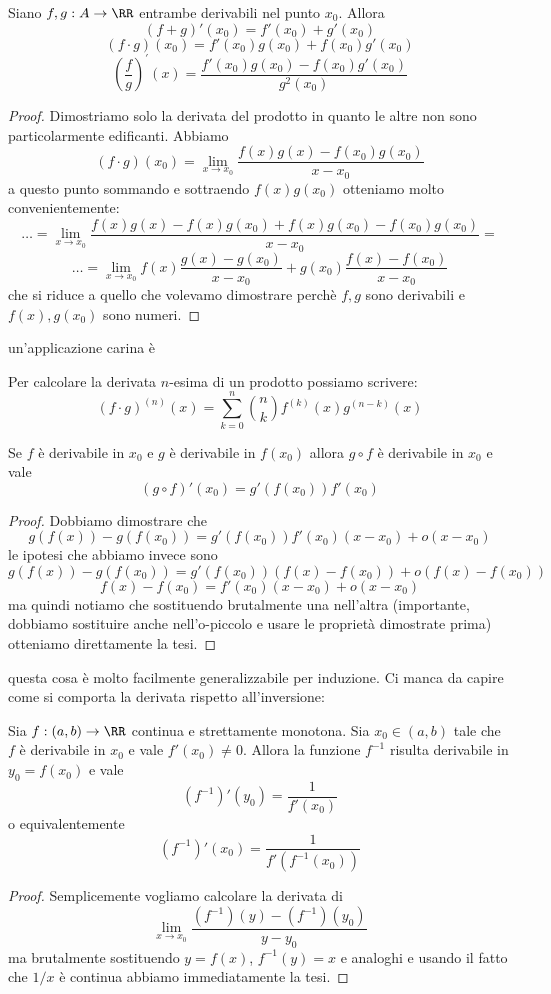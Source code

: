 \documentclass[11pt]{scrartcl}
\begin{document}
	\begin{theorem}
		Siano $f,g:A\to\RR$ entrambe derivabili nel punto $x_0$. Allora
		$$(f+g)'(x_0)=f'(x_0)+g'(x_0)$$
		$$(f\cdot g)(x_0)=f'(x_0)g(x_0)+f(x_0)g'(x_0)$$
		$$\left(\frac{f}{g}\right)^{'}(x)=\frac{f'(x_0)g(x_0)-f(x_0)g'(x_0)}{g^2(x_0)}$$
	\end{theorem}
	\begin{proof}
		Dimostriamo solo la derivata del prodotto in quanto le altre non sono particolarmente edificanti. Abbiamo
		$$(f\cdot g)(x_0)=\lim_{x\to x_0}\frac{f(x)g(x)-f(x_0)g(x_0)}{x-x_0}$$
		a questo punto sommando e sottraendo $f(x)g(x_0)$ otteniamo molto convenientemente:
		$$\dots=\lim_{x\to x_0}\frac{f(x)g(x)-f(x)g(x_0)+f(x)g(x_0)-f(x_0)g(x_0)}{x-x_0}=$$
		$$\dots=\lim_{x\to x_0}f(x)\frac{g(x)-g(x_0)}{x-x_0}+g(x_0)\frac{f(x)-f(x_0)}{x-x_0}$$
		che si riduce a quello che volevamo dimostrare perchè $f,g$ sono derivabili e $f(x),g(x_0)$ sono numeri.
	\end{proof}
	un'applicazione carina è
	\begin{corollary}
		Per calcolare la derivata $n$-esima di un prodotto possiamo scrivere:
		$$(f\cdot g)^{(n)}(x)=\sum_{k=0}^{n}\binom{n}{k}f^{(k)}(x)g^{(n-k)}(x)$$
	\end{corollary}
	\begin{theorem}
		Se $f$ è derivabile in $x_0$ e $g$ è derivabile in $f(x_0)$ allora $g\circ f$ è derivabile in $x_0$ e vale
		$$(g\circ f)'(x_0)=g'(f(x_0))f'(x_0)$$
	\end{theorem}
	\begin{proof}
		Dobbiamo dimostrare che 
		$$g(f(x))-g(f(x_0))=g'(f(x_0))f'(x_0)(x-x_0)+o(x-x_0)$$
		le ipotesi che abbiamo invece sono
		$$g(f(x))-g(f(x_0))=g'(f(x_0))(f(x)-f(x_0))+o(f(x)-f(x_0))$$
		$$f(x)-f(x_0)=f'(x_0)(x-x_0)+o(x-x_0)$$
		ma quindi notiamo che sostituendo brutalmente una nell'altra (importante, dobbiamo sostituire anche nell'o-piccolo e usare le proprietà dimostrate prima) otteniamo direttamente la tesi.
	\end{proof}
	questa cosa è molto facilmente generalizzabile per induzione. Ci manca da capire come si comporta la derivata rispetto all'inversione:
	\begin{theorem}
		Sia $f:(a,b)\to \RR$ continua e strettamente monotona. Sia $x_0\in (a,b)$ tale che $f$ è derivabile in $x_0$ e vale $f'(x_0)\ne 0$. Allora la funzione $f^{-1}$ risulta derivabile in $y_0=f(x_0)$ e vale
		$$\left(f^{-1}\right)'(y_0)=\frac{1}{f'(x_0)}$$
		o equivalentemente
		$$\left(f^{-1}\right)'(x_0)=\frac{1}{f'(f^{-1}(x_0))}$$
	\end{theorem}
	\begin{proof}
		Semplicemente vogliamo calcolare la derivata di 
		$$\lim_{x\to x_0}\frac{\left(f^{-1}\right)(y)-\left(f^{-1}\right)(y_0)}{y-y_0}$$
		ma brutalmente sostituendo $y=f(x)$, $f^{-1}(y)=x$ e analoghi e usando il fatto che $1/x$ è continua abbiamo immediatamente la tesi.
	\end{proof}
\end{document}
